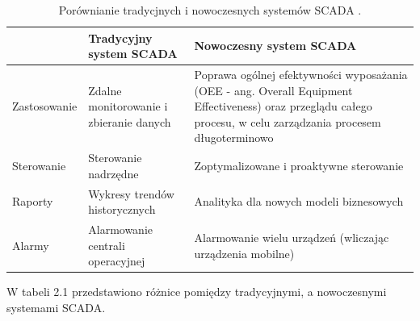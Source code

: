 \begin{table}[htbp]
	\renewcommand{\arraystretch}{1.5}
	\label{tab:SCADAPorownanie}
	\begin{tabular}{| >{\centering\arraybackslash}m{2.5cm} | >{\centering\arraybackslash}m{6cm} |>{\centering\arraybackslash}m{6.5cm} |}
		\hline 
		& \Large  Tradycyjny system SCADA & \Large  Nowoczesny system SCADA\\ 
		\hline 
		Zastosowanie & 
		Zdalne monitorowanie i zbieranie danych & 
		Poprawa ogólnej efektywności wyposażania (OEE - ang. Overall Equipment Effectiveness) oraz przeglądu całego procesu, w celu zarządzania procesem długoterminowo  \\ 
		\hline
		Sterowanie & 
		Sterowanie nadrzędne &
		Zoptymalizowane i proaktywne sterowanie  \\ 
		\hline
		Raporty & 
		Wykresy trendów historycznych & 
		Analityka dla nowych modeli biznesowych\\ 
		\hline
		Alarmy & 
		Alarmowanie centrali operacyjnej & 
		Alarmowanie wielu urządzeń (wliczając urządzenia mobilne)  \\ 
		\hline
	\end{tabular} 
	\caption{Porównianie tradycjnych i nowoczesnych systemów SCADA \cite{SCADATabela}.}
\end{table}

W tabeli 2.1 przedstawiono różnice pomiędzy tradycyjnymi, a nowoczesnymi systemami SCADA.







